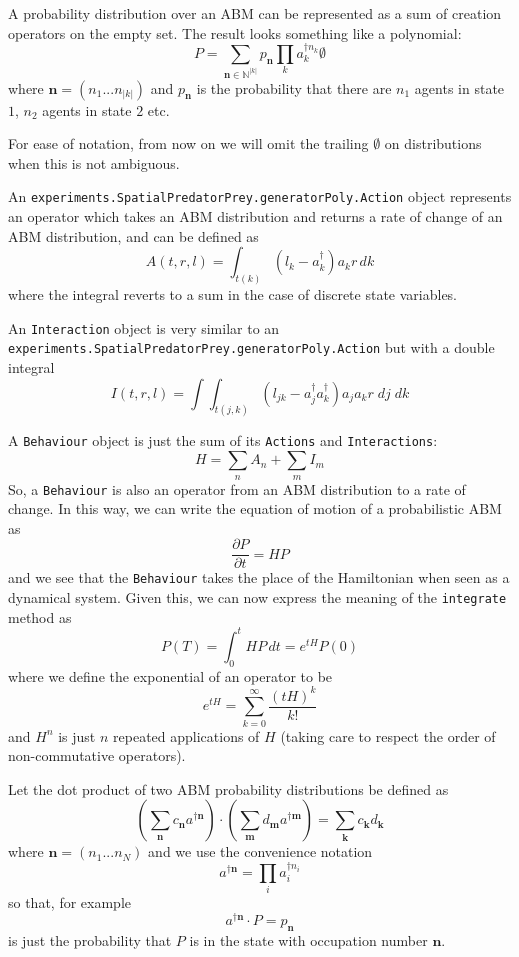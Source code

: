 \documentclass[letterpaper,twocolumn,10pt]{article}
\begin{document}
A probability distribution over an ABM can be represented as a sum of creation operators on the empty set. The result looks something like a polynomial:
\[
P = \sum_{\mathbf{n}\in \mathbb{N}^{|k|}} p_\mathbf{n} \prod_k a_k^{\dag n_k}\emptyset
\]
where $\mathbf{n} = (n_1...n_{|k|})$ and $p_\mathbf{n}$ is the probability that there are $n_1$ agents in state $1$, $n_2$ agents in state $2$ etc.

For ease of notation, from now on we will omit the trailing $\emptyset$ on distributions when this is not ambiguous.


An \texttt{experiments.SpatialPredatorPrey.generatorPoly.Action} object represents an operator which takes an ABM distribution and returns a rate of change of an ABM distribution, and can be defined as
\[
A(t,r,l) = \int_{t(k)} (l_k - a_k^\dag)a_kr \,dk
\] 
where the integral reverts to a sum in the case of discrete state variables.

An \texttt{Interaction} object is very similar to an \texttt{experiments.SpatialPredatorPrey.generatorPoly.Action} but with a double integral
\[
I(t,r,l) = \int \int_{t(j,k)} (l_{jk} - a_j^\dag a_k^\dag)a_j a_k r\;  dj\; dk
\] 

A \texttt{Behaviour} object is just the sum of its \texttt{Actions} and \texttt{Interactions}:
\[
H = \sum_n A_n + \sum_m I_m
\]
So, a \texttt{Behaviour} is also an operator from an ABM distribution to a rate of change. In this way, we can write the equation of motion of a probabilistic ABM as
\[
\frac{\partial P}{\partial t} = HP
\]
and we see that the \texttt{Behaviour} takes the place of the Hamiltonian when seen as a dynamical system. Given this, we can now express the meaning of the \texttt{integrate} method as
\begin{equation}
P(T) = \int_0^t HP \, dt = e^{tH}P(0)
\label{mastereq}
\end{equation}
where we define the exponential of an operator to be
\[
e^{tH} = \sum_{k=0}^\infty \frac{(tH)^k}{k!}
\]
and $H^n$ is just $n$ repeated applications of $H$ (taking care to respect the order of non-commutative operators).

Let the dot product of two ABM probability distributions be defined as
\[
\left(\sum_\mathbf{n} c_\mathbf{n} a^{\dag \mathbf{n}}\right) \cdot \left(\sum_\mathbf{m} d_\mathbf{m} a^{\dag \mathbf{m}}\right) = \sum_\mathbf{k} c_\mathbf{k}d_\mathbf{k}
\]
where $\mathbf{n} = (n_1...n_N)$ and we use the convenience notation
\[
a^{\dag \mathbf{n}} = \prod_i a_i^{\dag n_i}
\]
so that, for example
\[
a^{\dag \mathbf{n}} \cdot P = p_\mathbf{n}
\]
is just the probability that $P$ is in the state with occupation number $\mathbf{n}$.
\end{document}
